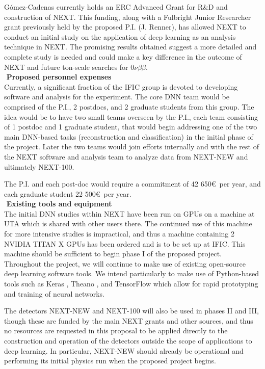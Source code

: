 \documentclass[11pt,a4paper]{article}
\begin{document}
G\'{o}mez-Cadenas currently holds an ERC Advanced Grant for R\&D and construction of NEXT. This funding, along with a Fulbright Junior Researcher grant previously held by the proposed P.I. (J. Renner), has allowed NEXT to conduct an initial study on the application of deep learning as an analysis technique in NEXT. The promising results obtained suggest a more detailed and complete study is needed and could make a key difference in the outcome of NEXT and future ton-scale searches for $0\nu\beta\beta$.\\

\noindent\textbf{\textbullet\,\,Proposed personnel expenses}\\
Currently, a significant fraction of the IFIC group is devoted to developing software and analysis for the experiment. The core DNN team would be comprised of the P.I., 2 postdocs, and 2 graduate students from this group. The idea would be to have two small teams overseen by the P.I., each team consisting of 1 postdoc and 1 graduate student, that would begin addressing one of the two main DNN-based tasks (reconstruction and classification) in the initial phase of the project. Later the two teams would join efforts internally and with the rest of the NEXT software and analysis team to analyze data from NEXT-NEW and ultimately NEXT-100.

The P.I. and each post-doc would require a commitment of 42 650\euro ~per year, and each graduate student 22 500\euro ~per year.\\

\noindent\textbf{\textbullet\,\,Existing tools and equipment}\\
The initial DNN studies within NEXT have been run on GPUs on a machine at UTA which is shared with other users there. The continued use of this machine for more intensive studies is impractical, and thus a machine containing 2 NVIDIA TITAN X GPUs has been ordered and is to be set up at IFIC. This machine should be sufficient to begin phase I of the proposed project. Throughout the project, we will continue to make use of existing open-source deep learning software tools. We intend particularly to make use of Python-based tools such as Keras \cite{Keras}, Theano \cite{Theano}, and TensorFlow \cite{Tensorflow} which allow for rapid prototyping and training of neural networks.

The detectors NEXT-NEW and NEXT-100 will also be used in phases II and III, though these are funded by the main NEXT grants and other sources, and thus no resources are requested in this proposal to be applied directly to the construction and operation of the detectors outside the scope of applications to deep learning. In particular, NEXT-NEW should already be operational and performing its initial physics run when the proposed project begins.\\
\end{document}
